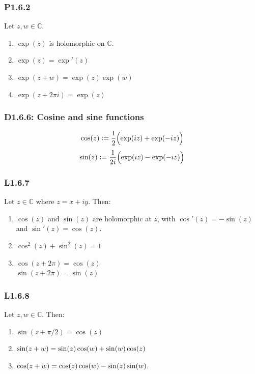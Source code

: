 \documentclass{article}
\newcommand{\deq}{\vcentcolon=}
\begin{document}
\begin{multicols*}{3}
\subsubsection*{P1.6.2}
Let $z,w\in\mathbb{C}$.
\begin{enumerate}
    \item $\exp(z)$ is holomorphic on $\mathbb{C}$.
    
    \item $\exp(z)=\exp'(z)$

    \item $\exp(z+w)=\exp(z)\exp(w)$
    
    \item $\exp(z+2\pi i)=\exp(z)$
\end{enumerate}

\subsubsection*{D1.6.6: Cosine and sine functions}
$$\cos(z)\deq\frac{1}{2}\Bigl(\exp(iz)+\exp(-iz)\Bigr)$$
$$\sin(z)\deq\frac{1}{2i}\Bigl(\exp(iz)-\exp(-iz)\Bigr)$$

\subsubsection*{L1.6.7}
Let $z\in\mathbb{C}$ where $z=x+iy$. Then:
\begin{enumerate}
    \item $\cos(z)$ and $\sin(z)$ are holomorphic at $z$,
    with $\cos'(z)=-\sin(z)$ and $\sin'(z)=\cos(z)$.

    \item $\cos^2(z)+\sin^2(z)=1$
    
    \item $\cos(z+2\pi)=\cos(z)$ \\
    $\sin(z+2\pi)=\sin(z)$
\end{enumerate}

\subsubsection*{L1.6.8}
Let $z,w\in\mathbb{C}$. Then:
\begin{enumerate}
    \item $\sin(z+\pi/2)=\cos(z)$
    
    \item $\sin(z+w) \\
    =\sin(z)\cos(w)+\sin(w)\cos(z)$

    \item $\cos(z+w) \\
    =\cos(z)\cos(w)-\sin(z)\sin(w)$.
\end{enumerate}


\end{multicols*}
\end{document}
